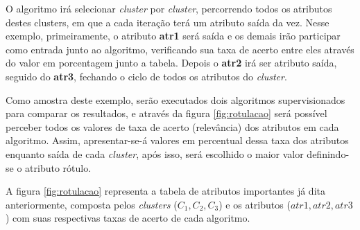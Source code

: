 O algoritmo irá selecionar \textit{cluster} por \textit{cluster}, percorrendo todos os atributos destes clusters, em que a cada iteração terá um atributo saída da vez. Nesse exemplo, primeiramente, o atributo \textbf{atr1} será saída e os demais irão participar como entrada junto ao algoritmo, verificando sua taxa de acerto entre eles através do valor em porcentagem junto a tabela. Depois o \textbf{atr2} irá ser atributo saída, seguido do \textbf{atr3}, fechando o ciclo de todos os atributos do \textit{cluster}.

Como amostra deste exemplo, serão executados dois algoritmos supervisionados para comparar os resultados, e através da figura \ref{fig:rotulacao} será possível perceber todos os valores de taxa de acerto (relevância) dos atributos em cada algoritmo. Assim, apresentar-se-á valores em percentual dessa taxa  dos atributos enquanto saída de cada \textit{cluster}, após isso, será escolhido o maior valor definindo-se o atributo rótulo. 

A figura \ref{fig:rotulacao} representa a tabela de atributos importantes já dita anteriormente, composta pelos \textit{clusters} (${C_1,C_2,C_3}$) e os atributos (${atr1,atr2,atr3}$) com suas respectivas taxas de acerto de cada algoritmo.



